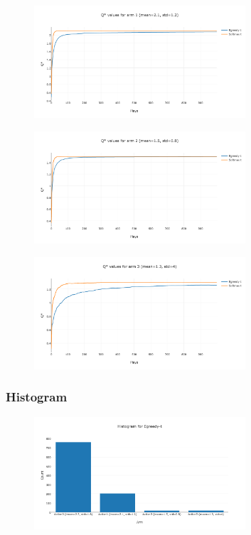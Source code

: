 \documentclass[11pt]{article}
\begin{document}
\begin{figure}[H]
   \centering
   \includegraphics[width=0.7\textwidth]{img/1-3/q2.png}
\end{figure}

\begin{figure}[H]
   \centering
   \includegraphics[width=0.7\textwidth]{img/1-3/q3.png}
\end{figure}


\begin{figure}[H]
   \centering
   \includegraphics[width=0.7\textwidth]{img/1-3/q4.png}
\end{figure}


\subsubsection{Histogram}

\begin{figure}[H]
   \centering
   \includegraphics[width=0.7\textwidth]{img/1-3/h1.png}
\end{figure}
\end{document}
